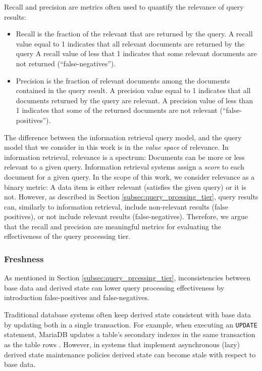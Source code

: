 Recall and precision are metrics often used to quantify the relevance of query results:
\begin{itemize}
  \item Recall is the fraction of the relevant that are returned by the query.
  A recall value equal to 1 indicates that all relevant documents are returned by the query
  A recall value of less that 1 indicates that some relevant documents are not returned (``false-negatives'').

  \item Precision is the fraction of relevant documents among the documents contained in the query result.
  A precision value equal to 1 indicates that all documents returned by the query are relevant.
  A precision value of less than 1 indicates that some of the returned documents are not relevant (``false-positives'').
\end{itemize}

The difference between the information retrieval query model, and the query model that we consider in this work is in the
\textit{value space} of relevance.
In information retrieval, relevance is a spectrum:
Documents can be more or less relevant to a given query.
Information retrieval systems assign a \textit{score} to each document for a given query.
In the scope of this work, we consider relevance as a binary metric:
A data item is either relevant (satisfies the given query) or it is not.
However, as described in Section \ref{subsec:query_prcessing_tier}, query results
can, similarly to information retrieval, include non-relevant results (false positives),
or not include relevant results (false-negatives).
Therefore, we argue that the recall and precision are meaningful metrics for evaluating the effectiveness of the query processing tier.

\subsubsection{Freshness}

As mentioned in Section \ref{subsec:query_prcessing_tier}, inconsistencies between base data and derived state can lower query
processing effectiveness by introduction false-positives and false-negatives.

Traditional database systems often keep derived state consistent with base data by updating both in a single transaction.
For example, when executing an \texttt{UPDATE} statement, MariaDB updates a table's secondary indexes in the same transaction
as the table rows \cite{innodb:writepaths}.
However, in systems that implement asynchronous (lazy) derived state maintenance policies \cite{tan:diffindex,
qi:secondaryindexconsistency, shukla:schemaagnostic} derived state can become stale with respect to base data.

